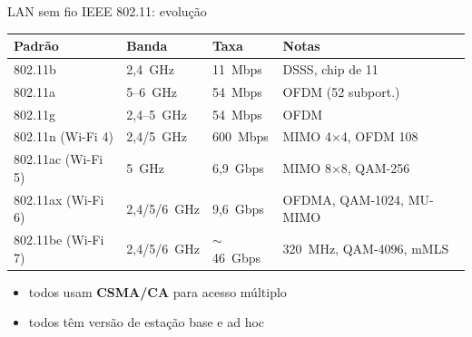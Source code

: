 \documentclass[aspectratio=169,11pt]{beamer}
\begin{document}
\begin{frame}{LAN sem fio IEEE 802.11: evolução}
  \begin{center}
    \scriptsize
    \begin{tabular}{@{}llll@{}}
      \toprule
      \textbf{Padrão} & \textbf{Banda} & \textbf{Taxa} & \textbf{Notas}\\
      \midrule
      802.11b & 2,4~GHz & 11~Mbps & DSSS, chip de 11\\
      802.11a & 5--6~GHz & 54~Mbps & OFDM (52 subport.)\\
      802.11g & 2,4--5~GHz & 54~Mbps & OFDM\\
      802.11n (Wi-Fi 4) & 2,4/5~GHz & 600~Mbps & MIMO 4$\times$4, OFDM 108\\
      802.11ac (Wi-Fi 5) & 5~GHz & 6,9~Gbps & MIMO 8$\times$8, QAM-256\\
      802.11ax (Wi-Fi 6) & 2,4/5/6~GHz & 9,6~Gbps & OFDMA, QAM-1024, MU-MIMO\\
      802.11be (Wi-Fi 7) & 2,4/5/6~GHz & $\sim$46~Gbps & 320~MHz, QAM-4096, mMLS\\
      \bottomrule
    \end{tabular}
  \end{center}
  \begin{itemize}
    \item todos usam \textbf{CSMA/CA} para acesso múltiplo
    \item todos têm versão de estação base e ad hoc
  \end{itemize}
\end{frame}
\end{document}
